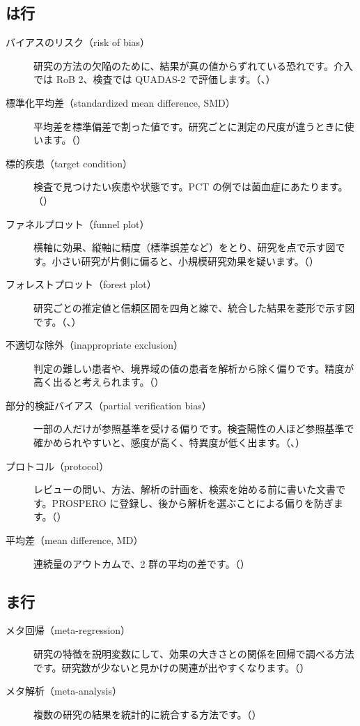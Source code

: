\subsection*{は行}
\begin{description}
\item[バイアスのリスク（risk of bias）] 研究の方法の欠陥のために、結果が真の値からずれている恐れです。介入では RoB 2、検査では QUADAS-2 で評価します。（、）
\item[標準化平均差（standardized mean difference, SMD）] 平均差を標準偏差で割った値です。研究ごとに測定の尺度が違うときに使います。（）
\item[標的疾患（target condition）] 検査で見つけたい疾患や状態です。PCT の例では菌血症にあたります。（）
\item[ファネルプロット（funnel plot）] 横軸に効果、縦軸に精度（標準誤差など）をとり、研究を点で示す図です。小さい研究が片側に偏ると、小規模研究効果を疑います。（）
\item[フォレストプロット（forest plot）] 研究ごとの推定値と信頼区間を四角と線で、統合した結果を菱形で示す図です。（、）
\item[不適切な除外（inappropriate exclusion）] 判定の難しい患者や、境界域の値の患者を解析から除く偏りです。精度が高く出ると考えられます。（）
\item[部分的検証バイアス（partial verification bias）] 一部の人だけが参照基準を受ける偏りです。検査陽性の人ほど参照基準で確かめられやすいと、感度が高く、特異度が低く出ます。（、）
\item[プロトコル（protocol）] レビューの問い、方法、解析の計画を、検索を始める前に書いた文書です。PROSPERO に登録し、後から解析を選ぶことによる偏りを防ぎます。（）
\item[平均差（mean difference, MD）] 連続量のアウトカムで、2 群の平均の差です。（）
\end{description}

\subsection*{ま行}
\begin{description}
\item[メタ回帰（meta-regression）] 研究の特徴を説明変数にして、効果の大きさとの関係を回帰で調べる方法です。研究数が少ないと見かけの関連が出やすくなります。（）
\item[メタ解析（meta-analysis）] 複数の研究の結果を統計的に統合する方法です。（）
\end{description}

